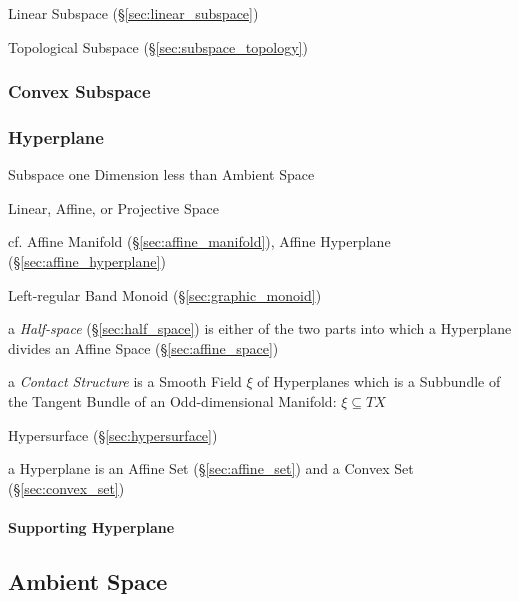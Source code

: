 \fist Linear Subspace (\S\ref{sec:linear_subspace})

\fist Topological Subspace (\S\ref{sec:subspace_topology})



\subsubsection{Convex Subspace}\label{sec:convex_subspace}

\subsubsection{Hyperplane}\label{sec:hyperplane}

Subspace one Dimension less than Ambient Space

Linear, Affine, or Projective Space %

cf. Affine Manifold (\S\ref{sec:affine_manifold}), Affine Hyperplane
(\S\ref{sec:affine_hyperplane})

Left-regular Band Monoid (\S\ref{sec:graphic_monoid})

a \emph{Half-space} (\S\ref{sec:half_space}) is either of the two parts into
which a Hyperplane divides an Affine Space (\S\ref{sec:affine_space})

a \emph{Contact Structure} is a Smooth Field $\xi$ of Hyperplanes which is a
Subbundle of the Tangent Bundle of an Odd-dimensional Manifold: $\xi \subseteq
T X$

\fist Hypersurface (\S\ref{sec:hypersurface})

a Hyperplane is an Affine Set (\S\ref{sec:affine_set}) and a Convex Set
(\S\ref{sec:convex_set})



\paragraph{Supporting Hyperplane}\label{sec:supporting_hyperplane}\hfill



\subsection{Ambient Space}\label{sec:ambient_space}




